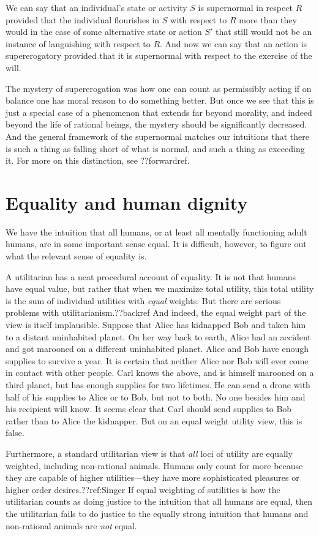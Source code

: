 We can say that an individual's state or activity $S$ is supernormal in respect $R$ provided that the individual flourishes 
in $S$ with respect to $R$ more than they would in the case of some alternative state or action $S'$ that
still would not be an instance of languishing with respect to $R$. And now we can say that an action is supererogatory
provided that it is supernormal with respect to the exercise of the will. 

The mystery of supererogation was how one can count as permissibly acting if on balance one has moral reason to do something 
better. But once we see that this is just a special case of a phenomenon that extends far beyond morality, and indeed beyond
the life of rational beings, the mystery should be significantly decreased. And the general framework of the supernormal
matches our intuitions that there is such a thing as falling short of what is normal, and such a thing as exceeding it.
For more on this distinction, see ??forwardref.

\section{Equality and human dignity}
We have the intuition that all humans, or at least all mentally functioning adult humans, are in some important sense 
equal. It is difficult, however, to figure out what the relevant sense of equality is.

A utilitarian has a neat procedural account of equality. It is not that humans have equal value, but rather
that when we maximize total utility, this total utility is the sum of
individual utilities with \textit{equal} weights. But there are serious problems with
utilitarianism.??backref And indeed, the equal weight part of the view is itself implausible. Suppose that 
Alice has kidnapped Bob and taken him to a distant uninhabited planet. On her way back to earth, Alice 
had an accident and got marooned on a different uninhabited planet. Alice and Bob have enough supplies to
survive a year. It is certain that neither Alice nor Bob will ever come in contact with other people. 
Carl knows the above, and is himself marooned on a third planet, but has enough 
supplies for two lifetimes. He can send a drone with half of his supplies to Alice or to Bob, but not to
both. No one besides him and his recipient will know. It seems clear that Carl should send supplies to
Bob rather than to Alice the kidnapper. But on an equal weight utility view, this is false.

Furthermore, a standard utilitarian view is that \textit{all} loci of utility are equally weighted, including
non-rational animals. Humans only count for more because they are capable of higher utilities---they have more
sophisticated pleasures or higher order desires.??ref:Singer If equal weighting of sutilities
is how the utilitarian counts as doing justice to the intuition that all humans are equal, then the utilitarian
fails to do justice to the equally strong intuition that humans and non-rational animals are \textit{not} equal.

